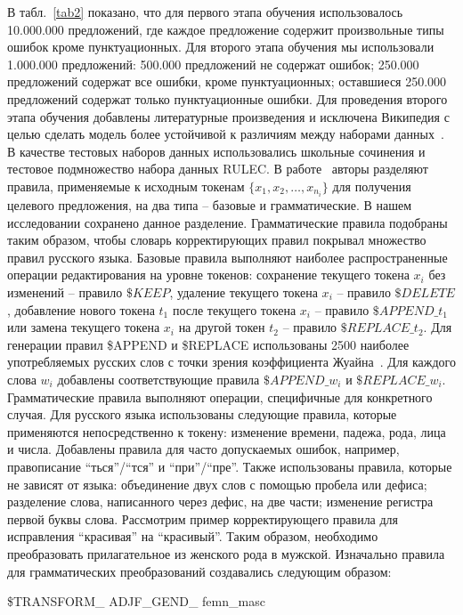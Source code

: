 В табл.~\ref{tab2} показано, что для первого этапа обучения использовалось 10.000.000 предложений, где каждое предложение содержит произвольные типы ошибок кроме пунктуационных. Для второго этапа обучения мы использовали 1.000.000 предложений: 500.000 предложений не содержат ошибок; 250.000 предложений содержат все ошибки, кроме пунктуационных; оставшиеся 250.000 предложений содержат только пунктуационные ошибки. Для проведения второго этапа обучения добавлены литературные произведения и исключена Википедия с целью сделать модель более устойчивой к различиям между наборами данных~\cite{b26}. В качестве тестовых наборов данных использовались школьные сочинения и тестовое подмножество набора данных RULEC. 
В работе~\cite{b15} авторы разделяют правила, применяемые к исходным токенам $\{x_1,x_2,…,x_{n_i} \}$ для получения целевого предложения, на два типа – базовые и грамматические. В нашем исследовании сохранено данное разделение. Грамматические правила подобраны таким образом, чтобы словарь корректирующих правил покрывал множество правил русского языка. Базовые правила выполняют наиболее распространенные операции редактирования на уровне токенов: сохранение текущего токена $x_i$ без изменений – правило $\$KEEP$, удаление текущего токена $x_i$ – правило $\$DELETE$, добавление нового токена $t_1$ после текущего токена $x_i$ – правило $\$APPEND\_t_1$ или замена текущего токена $x_i$ на другой токен $t_2$ – правило $\$REPLACE\_t_2$. Для генерации правил \$APPEND и \$REPLACE использованы 2500 наиболее употребляемых русских слов с точки зрения коэффициента Жуайна~\cite{b27}. Для каждого слова $w_i$ добавлены соответствующие правила $\$APPEND\_w_i$ и $\$REPLACE\_w_i$.
Грамматические правила выполняют операции, специфичные для конкретного случая. Для русского языка использованы следующие правила, которые применяются непосредственно к токену: изменение времени, падежа, рода, лица и числа. Добавлены правила для часто допускаемых ошибок, например, правописание “ться”/“тся” и “при”/“пре”. Также использованы правила, которые не зависят от языка: объединение двух слов с помощью пробела или дефиса; разделение слова, написанного через дефис, на две части; изменение регистра первой буквы слова.
Рассмотрим пример корректирующего правила для исправления “красивая” на “красивый”. Таким образом, необходимо преобразовать прилагательное из женского рода в мужской. Изначально правила для грамматических преобразований создавались следующим образом:
\begin{center}
\$TRANSFORM\_{\color{orange} ADJF}\_GEND\_{\color{orange} femn}\_masc
\end{center}
